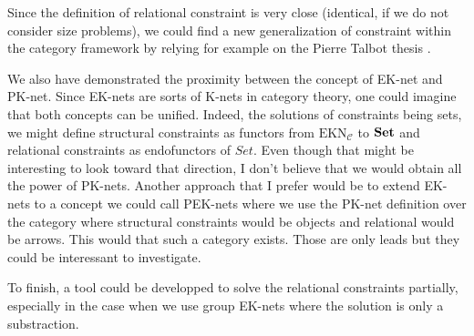 Since the definition of relational constraint is very close (identical, if we do not consider size problems), we could find a new generalization of constraint within the category framework by relying for example on the Pierre Talbot thesis \cite{talbot2018spacetime}.

We also have demonstrated the proximity between the concept of EK-net and PK-net. Since EK-nets are sorts of K-nets in category theory, one could imagine that both concepts can be unified. Indeed, the solutions of constraints being sets, we might define structural constraints as functors from $\text{EKN}_\mathcal{C}$ to $\bf Set$ and relational constraints as endofunctors of $Set$. Even though that might be interesting to look toward that direction, I don't believe that we would obtain all the power of PK-nets.\newline
Another approach that I prefer would be to extend EK-nets to a concept we could call PEK-nets where we use the PK-net definition over the category where structural constraints would be objects and relational would be arrows. This would that such a category exists. Those are only leads but they could be interessant to investigate.

To finish, a tool could be developped to solve the relational constraints partially, especially in the case when we use group EK-nets where the solution is only a substraction.
